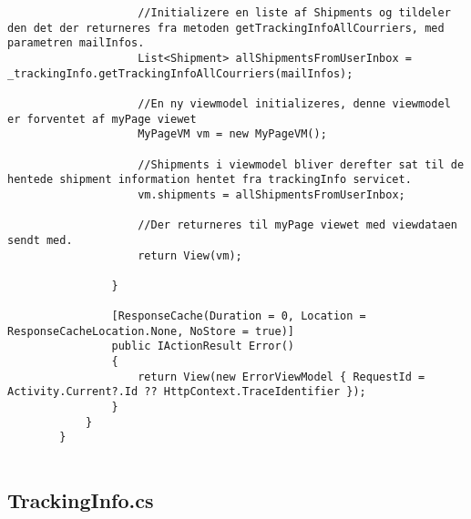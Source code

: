 \begin{verbatim}
                    //Initializere en liste af Shipments og tildeler den det der returneres fra metoden getTrackingInfoAllCourriers, med parametren mailInfos.
                    List<Shipment> allShipmentsFromUserInbox = _trackingInfo.getTrackingInfoAllCourriers(mailInfos);
        
                    //En ny viewmodel initializeres, denne viewmodel er forventet af myPage viewet
                    MyPageVM vm = new MyPageVM();
        
                    //Shipments i viewmodel bliver derefter sat til de hentede shipment information hentet fra trackingInfo servicet.
                    vm.shipments = allShipmentsFromUserInbox;
        
                    //Der returneres til myPage viewet med viewdataen sendt med.
                    return View(vm);
        
                }
        
                [ResponseCache(Duration = 0, Location = ResponseCacheLocation.None, NoStore = true)]
                public IActionResult Error()
                {
                    return View(new ErrorViewModel { RequestId = Activity.Current?.Id ?? HttpContext.TraceIdentifier });
                }
            }
        }
        
\end{verbatim}

\subsection{TrackingInfo.cs}


